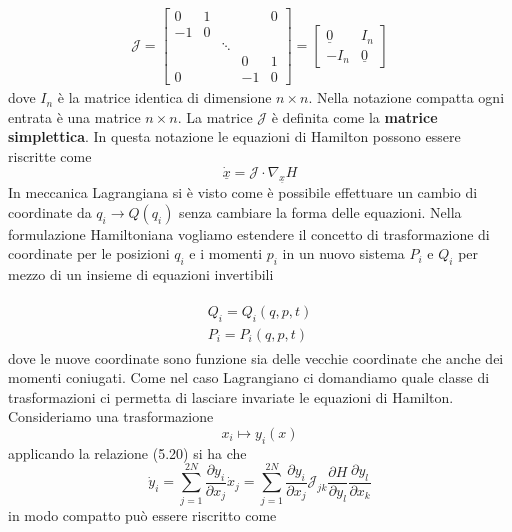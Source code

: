 \begin{align}
\mathcal{J}=\left[\begin{array}{ccccc}
0 & 1 & & & 0 \\
-1 & 0 & & & \\
& & \ddots & & \\
& & & 0 & 1 \\
0 & & & -1 & 0
\end{array}\right]
= \left[\begin{array}{cc}
		\underline{0} & I_n \\
		-I_n & \underline{0}
\end{array} \right]
\end{align}
dove $I_n$ \`{e} la matrice identica di dimensione $n \times n$. Nella notazione compatta ogni entrata \`{e} una matrice $n \times n$. La matrice $\mathcal{J}$ \`{e} definita come la \textbf{matrice simplettica}. In questa notazione le equazioni di Hamilton possono essere riscritte come 
\begin{equation}
	\underline{\dot{x}} = \mathcal{J} \cdot \nabla_{\underline{x}} H
\end{equation}
In meccanica Lagrangiana si \`{e} visto come \`{e} possibile effettuare un cambio di coordinate da $q_i \rightarrow Q(q_i)$ senza cambiare la forma delle equazioni. Nella formulazione Hamiltoniana vogliamo estendere il concetto di trasformazione di coordinate per le posizioni $q_i$ e i momenti $p_i$ in un nuovo sistema $P_i$ e $Q_i$ per mezzo di un insieme di equazioni invertibili

\begin{align}
	\begin{array}{c}
		Q_i = Q_i(q,p,t)\\[0.5em]
		P_i = P_i(q,p,t)
	\end{array}	
\end{align}
dove le nuove coordinate sono funzione sia delle vecchie coordinate che anche dei momenti coniugati. Come nel caso Lagrangiano ci domandiamo quale classe di trasformazioni ci permetta di lasciare invariate le equazioni di Hamilton. Consideriamo una trasformazione
\begin{equation*}
	x_i \mapsto y_i(x)
\end{equation*}
applicando la relazione (5.20) si ha che 
\begin{equation*}
	\dot{y}_i = \sum_{j=1}^{2N}\dfrac{\partial y_i}{\partial x_j}\dot{x}_j = \sum_{j=1}^{2N}\dfrac{\partial y_i}{\partial x_j} \mathcal{J}_{jk} \dfrac{\partial H}{\partial y_l}\dfrac{\partial y_l}{\partial x_k}
\end{equation*}
in modo compatto pu\`{o} essere riscritto come

